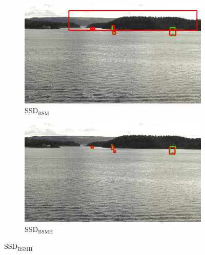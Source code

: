 \begin{figure}[h!]
\begin{subfigure}{.5\textwidth}
  \centering
  \includegraphics[width=0.9\linewidth]{results/case_buildings/bigbox_bcbf/SSD2/selected_08_04_frame3470.jpg}
  \caption{SSD$_{\text{BSM}}$}
  \label{fig:sfig1}
\end{subfigure}%
\begin{subfigure}{.5\textwidth}
  \centering
  \includegraphics[width=.9\linewidth]{results/case_buildings/bigbox_bcbf/SSD3/selected_08_04_frame3470.jpg}
  \caption{SSD$_{\text{BSMH}}$}
  \label{fig:sfig2}
\end{subfigure}


\end{figure}
